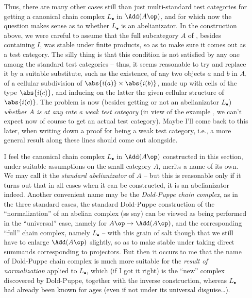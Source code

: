Thus, there are many other cases still than just multi-standard test
categories for getting a canonical chain complex $L_\bullet$ in
$\Add(A\op)$, and for which now the question makes sense as to whether
$L_\bullet$ is an abelianizator. In the construction above, we were
careful to assume that the full subcategory $A$ of \Ord, besides
containing $I$, was stable under finite products, so as to make sure
it comes out as a test category. The silly thing is that this
condition is not satisfied by any one among the standard test
categories -- thus, it seems reasonable to try and replace
it by a suitable substitute, such as the existence, of any two objects
$a$ and $b$ in $A$, of a cellular subdivision of
$\abs{i(a)}\times\abs{i(b)}$, made up with cells of the type
$\abs{i(c)}$, and inducing on the latter the given cellular structure
of $\abs{i(c)}$. The problem is now (besides getting or not an
abelianizator $L_\bullet$) \emph{whether $A$ is at any rate a weak
  test category} (in view of the example \Simplexf, we can't expect
now of course to get an actual test category). Maybe I'll come back to
this later, when writing down a proof for \Simplexf{} being a weak
test category, i.e., a more general result along these lines should
come out alongside.

\begin{remarks}
  I feel the canonical chain complex $L_\bullet$ in $\Add(A\op)$
  constructed in this section, under suitable assumptions on the small
  category $A$, merits a name of its own. We may call it the
  \emph{standard abelianizator} of $A$ -- but this is reasonable only
  if it turns out that in all cases when it can be constructed, it is
  an abelianizator indeed. Another convenient name may be the
  \emph{Dold-Puppe chain complex}, as in the three standard cases, the
  standard Dold-Puppe construction of the ``normalization'' of an
  abelian complex (ss say) can be viewed as being performed in the
  ``universal'' case, namely for $A\op\to\Add(A\op)$, and the
  corresponding ``full'' chain complex, namely $L_\bullet$ -- with
  this grain of salt though that we still have to enlarge $\Add(A\op)$
  slightly, so as to make stable under taking direct summands
  corresponding to projectors. But then it occurs to me that the name
  of Dold-Puppe chain complex is much more suitable for the
  \emph{result of normalization} applied to $L_\bullet$, which (if I
  got it right) is the ``new'' complex discovered by Dold-Puppe,
  together with the inverse construction, whereas $L_\bullet$ had
  already been known for ages (even if not under its universal
  disguise\ldots).
\end{remarks}

